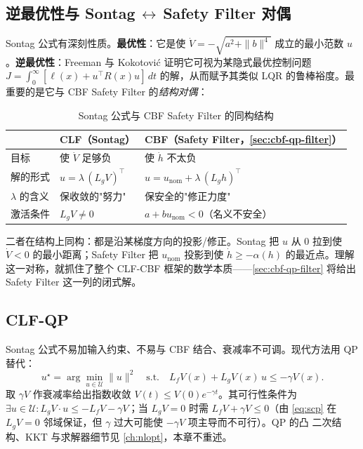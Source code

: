 \subsection{逆最优性与 Sontag\,\texorpdfstring{$\leftrightarrow$}{<->}\,Safety Filter 对偶}
\label{sec:sontag-dual}

Sontag 公式有深刻性质。\textbf{最优性}：它是使 $\dot V=-\sqrt{a^2+\|b\|^4}$ 成立的最小范数 $u$。\textbf{逆最优性}：Freeman 与 Kokotovi\'c \cite{freeman1996inverse} 证明它可视为某隐式最优控制问题 $J=\int_0^\infty[\ell(x)+u^\top R(x)u]\,dt$ 的解，从而赋予其类似 LQR 的鲁棒裕度。最重要的是它与 CBF Safety Filter 的\emph{结构对偶}：

\begin{table}[H]\centering\small
\caption{Sontag 公式与 CBF Safety Filter 的同构结构}
\label{tab:sontag-vs-filter}
\begin{tabular}{lll}
\toprule
& CLF（Sontag） & CBF（Safety Filter，\cref{sec:cbf-qp-filter}） \\
\midrule
目标 & 使 $\dot V$ 足够负 & 使 $\dot h$ 不太负 \\
解的形式 & $u=\lambda\,(L_gV)^\top$ & $u=u_{\mathrm{nom}}+\lambda\,(L_gh)^\top$ \\
$\lambda$ 的含义 & 保收敛的"努力" & 保安全的"修正力度" \\
激活条件 & $L_gV\neq0$ & $a+bu_{\mathrm{nom}}<0$（名义不安全） \\
\bottomrule
\end{tabular}
\end{table}

\begin{insight}
二者在结构上同构：都是沿某梯度方向的投影/修正。Sontag 把 $u$ 从 $0$ 拉到使 $\dot V<0$ 的最小距离；Safety Filter 把 $u_{\mathrm{nom}}$ 投影到使 $\dot h\ge-\alpha(h)$ 的最近点。理解这一对称，就抓住了整个 CLF-CBF 框架的数学本质——\cref{sec:cbf-qp-filter} 将给出 Safety Filter 这一列的闭式解。
\end{insight}

\subsection{CLF-QP}

Sontag 公式不易加输入约束、不易与 CBF 结合、衰减率不可调。现代方法用 QP 替代：
\begin{equation}
u^\star=\arg\min_{u\in\mathcal U}\|u\|^2\quad\text{s.t.}\quad L_fV(x)+L_gV(x)\,u\le-\gamma V(x).
\label{eq:clf-qp}
\end{equation}
取 $\gamma V$ 作衰减率给出指数收敛 $V(t)\le V(0)e^{-\gamma t}$。其可行性条件为 $\exists u\in\mathcal U:L_gV\cdot u\le-L_fV-\gamma V$；当 $L_gV=0$ 时需 $L_fV+\gamma V\le0$（由 \cref{eq:scp} 在 $L_gV=0$ 邻域保证，但 $\gamma$ 过大可能使 $-\gamma V$ 项主导而不可行）。QP 的凸 二次结构、KKT 与求解器细节见 \cref{ch:nlopt}，本章不重述。

